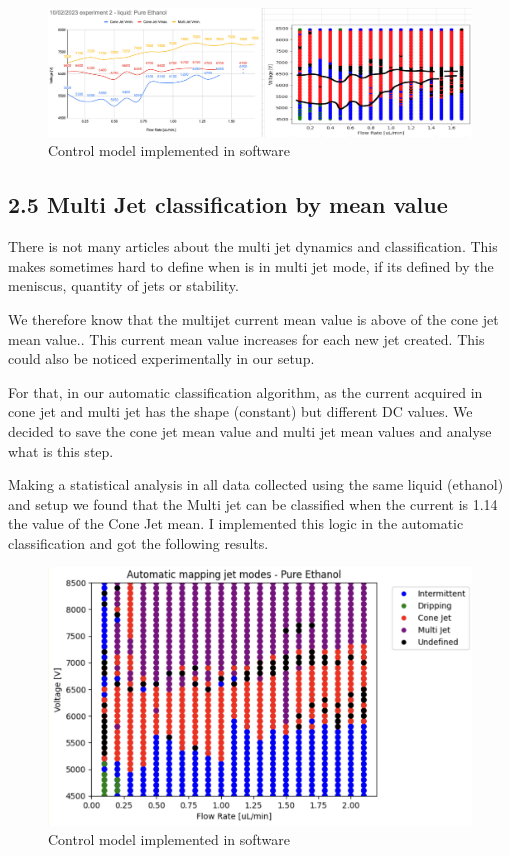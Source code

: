     \begin{figure}[H]
        \center
        \includegraphics[width=15cm]{images/image_folder_report_4/mapXman-2.png}
        \caption{Control model implemented in software}
    \end{figure}



\subsection*{2.5 Multi Jet classification by mean value}

    There is not many articles about the multi jet dynamics and classification. This makes sometimes hard to define when
    is in multi jet mode, if its defined by the meniscus, quantity of jets or stability.

    We therefore know that the multijet current mean value is above of the cone jet mean value.\cite{Ryan}. This current mean value
    increases for each new jet created. This could also be noticed experimentally in our setup.

    For that, in our automatic classification algorithm, as the current acquired in cone jet and multi jet has the shape (constant) but different DC values. We decided
    to save the cone jet mean value and multi jet mean values and analyse what is this step.

    Making a statistical analysis in all data collected using the same liquid (ethanol) and setup we found that the Multi jet can be classified when the current is 1.14 the value of the Cone Jet mean.
    I implemented this logic in the automatic classification and got the following results.

    \begin{figure}[H]
        \center
        \includegraphics[width=15cm]{images/image_folder_report_4/map7-automatic.png}
        \caption{Control model implemented in software}
    \end{figure}



